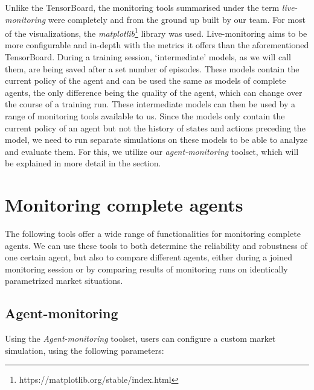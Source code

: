 Unlike the TensorBoard, the monitoring tools summarised under the term \emph{live-monitoring} were completely and from the ground up built by our team. For most of the visualizations, the \emph{matplotlib}\footnote[0][-0.2]{https://matplotlib.org/stable/index.html} library was used. Live-monitoring aims to be more configurable and in-depth with the metrics it offers than the aforementioned TensorBoard.  During a training session, `intermediate' models, as we will call them, are being saved after a set number of episodes.  These models contain the current policy of the agent and can be used the same as models of complete agents, the only difference being the quality of the agent, which can change over the course of a training run. These intermediate models can then be used by a range of monitoring tools available to us. Since the models only contain the current policy of an agent but not the history of states and actions preceding the model, we need to run separate simulations on these models to be able to analyze and evaluate them. For this, we utilize our \emph{agent-monitoring} toolset, which will be explained in more detail in the  section.

\section{Monitoring complete agents}\label{sec:CompleteAgents}

The following tools offer a wide range of functionalities for monitoring complete agents. We can use these tools to both determine the reliability and robustness of one certain agent, but also to compare different agents, either during a joined monitoring session or by comparing results of monitoring runs on identically parametrized market situations.

\subsection*{Agent-monitoring}\label{subsec:AgentMonitoring}

Using the \emph{Agent-monitoring} toolset, users can configure a custom market simulation, using the following parameters:

